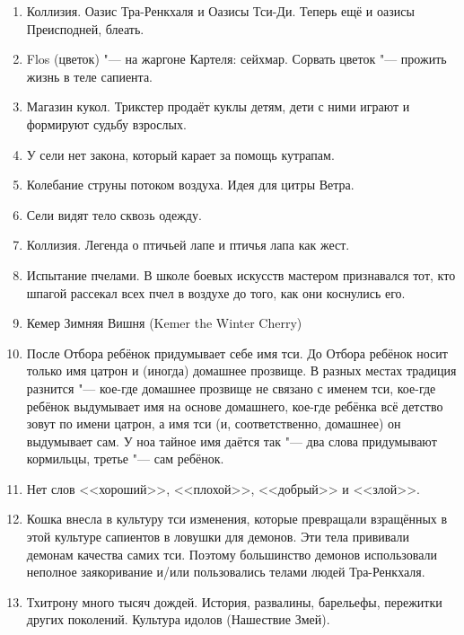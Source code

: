 \documentclass[a4paper,10pt]{book}
\begin{document}
\begin{enumerate}
\item Коллизия. Оазис Тра-Ренкхаля и Оазисы Тси-Ди. Теперь ещё и оазисы Преисподней, блеать.

\item Flos (цветок) "--- на жаргоне Картеля: сейхмар. Сорвать цветок "--- прожить жизнь в теле сапиента.

\item Магазин кукол. Трикстер продаёт куклы детям, дети с ними играют и формируют судьбу взрослых.

\item У сели нет закона, который карает за помощь кутрапам.

\item Колебание струны потоком воздуха. Идея для цитры Ветра.

\item Сели видят тело сквозь одежду.

\item Коллизия. Легенда о птичьей лапе и птичья лапа как жест.

\item Испытание пчелами. В школе боевых искусств мастером признавался тот, кто 
шпагой рассекал всех пчел в воздухе до того, как они коснулись его.

\item Кемер Зимняя Вишня (Kemer the Winter Cherry)

\item После Отбора ребёнок придумывает себе имя тси. До Отбора ребёнок носит
только имя цатрон и (иногда) домашнее прозвище. В разных местах традиция
разнится "--- кое-где домашнее прозвище не связано с именем тси,
кое-где ребёнок выдумывает имя на основе домашнего, кое-где ребёнка всё детство
зовут по имени цатрон, а имя тси (и, соответственно, домашнее) он выдумывает 
сам.
У ноа тайное имя даётся так "--- два слова придумывают кормильцы,
третье "--- сам ребёнок.

\item Нет слов <<хороший>>, <<плохой>>, <<добрый>> и <<злой>>.

\item Кошка внесла в культуру тси изменения, которые превращали взращённых в 
этой культуре
сапиентов в ловушки для демонов. Эти тела прививали демонам качества самих тси.
Поэтому большинство демонов использовали неполное заякоривание и/или 
пользовались телами
людей Тра-Ренкхаля.

\item Тхитрону много тысяч дождей. История, развалины, барельефы, 
пережитки других поколений. Культура идолов (Нашествие Змей).


\end{enumerate}
\end{document}
